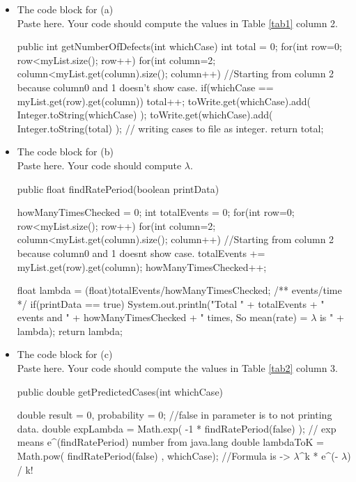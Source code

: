 \documentclass[a4 paper]{article}
\numberwithin{equation}{section}
\newcommand{\0}{\mathbf{0}}
\begin{document}
\begin{itemize}
\begin{python}[frame=single]
{    }
            \end{python}
            
        \newpage
		\item The code block for (a)\\
		Paste here. Your code should compute the values in Table \ref{tab1} column 2.
		\begin{python}[frame=single]
    		public int getNumberOfDefects(int whichCase){
            int total = 0;
            for(int row=0; row<myList.size(); row++){
                for(int column=2; column<myList.get(column).size(); column++){ //Starting from column 2 because column0 and 1 doesn't show case.
                    if(whichCase == myList.get(row).get(column))
                        total++;
                }
            }
            toWrite.get(whichCase).add( Integer.toString(whichCase) );
            toWrite.get(whichCase).add( Integer.toString(total) ); // writing cases to file as integer.
            return total;
        }
		\end{python}
		
		\item The code block for (b)\\
		Paste here. Your code should compute $\lambda$.
		\begin{python}[frame=single]
		    public float findRatePeriod(boolean printData){
        howManyTimesChecked = 0;
        int totalEvents = 0;
        for(int row=0; row<myList.size(); row++)
            for(int column=2; column<myList.get(column).size(); column++){ //Starting from column 2 because column0 and 1 doesnt show case.
                totalEvents += myList.get(row).get(column);
                howManyTimesChecked++;
            }
        
        float lambda = (float)totalEvents/howManyTimesChecked; /** events/time */
        if(printData == true)
            System.out.println("Total " + totalEvents + " events and " + howManyTimesChecked + " times, So mean(rate) =  $\lambda$ is " + lambda);
        return lambda;
    }
		\end{python}
		
		\item The code block for (c)\\
		Paste here. Your code should compute the values in Table \ref{tab2} column 3. 
		\begin{python}[frame=single]
    		    public double getPredictedCases(int whichCase){
            double result = 0, probability = 0;
            //false in parameter is to not printing data.
            double expLambda = Math.exp( -1 * findRatePeriod(false) ); // exp means e^(findRatePeriod) number from java.lang
            double lambdaToK = Math.pow( findRatePeriod(false) , whichCase);
            //Formula is -> $\lambda$^k * e^(- $\lambda$) / k!
    
}
\end{python}
\end{itemize}
\end{document}
